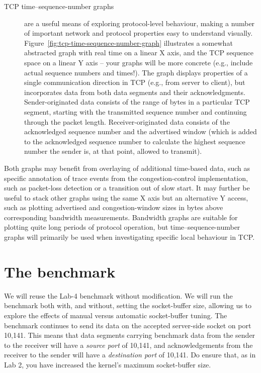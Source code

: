 \documentclass[a4paper,10pt]{article}
\begin{document}
\begin{description}
\item[TCP time--sequence-number graphs] are a useful means of exploring
  protocol-level behaviour, making a number of important network and protocol
  properties easy to understand visually.
  Figure~\ref{fig:tcp-time-sequence-number-graph} illustrates a somewhat
  abstracted graph with real time on a linear X axis, and the TCP sequence
  space on a linear Y axis -- your graphs will be more concrete (e.g., include
  actual sequence numbers and times!).
  The graph displays properties of a single communication direction in TCP
  (e.g., from server to client), but incorporates data from both data segments
  and their acknowledgments.
  Sender-originated data consists of the range of bytes in a particular TCP
  segment, starting with the transmitted sequence number and continuing
  through the packet length.
  Receiver-originated data consists of the acknowledged sequence number and
  the advertised window (which is added to the acknowledged sequence number
  to calculate the highest sequence number the sender is, at that point,
  allowed to transmit).
\end{description}

Both graphs may benefit from overlaying of additional time-based data, such as
specific annotation of trace events from the congestion-control
implementation, such as packet-loss detection or a transition out of slow
start.
It may further be useful to stack other graphs using the same X axis but an
alternative Y access, such as plotting advertised and congestion-window sizes
in bytes above corresponding bandwidth measurements.
Bandwidth graphs are suitable for plotting quite long periods of protocol
operation, but time--sequence-number graphs will primarily be used when
investigating specific local behaviour in TCP.

\section*{The benchmark}

We will reuse the Lab-4 benchmark without modification.
We will run the benchmark both with, and without, setting the socket-buffer
size, allowing us to explore the effects of manual versus automatic
socket-buffer tuning.
The benchmark continues to send its data on the accepted server-side socket on
port 10,141.
This means that data segments carrying benchmark data from the sender to the
receiver will have a \textit{source port} of 10,141, and acknowledgements from
the receiver to the sender will have a \textit{destination port} of 10,141.
Do ensure that, as in Lab 2, you have increased the kernel's maximum 
socket-buffer size.
\end{document}
